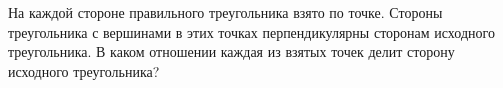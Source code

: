 \begin{ex}
	\begin{condition}
		На каждой стороне правильного треугольника взято по точке. Стороны треугольника с вершинами в этих точках перпендикулярны сторонам исходного треугольника. В каком отношении каждая из взятых точек делит сторону исходного	треугольника?
	\end{condition}
\end{ex}